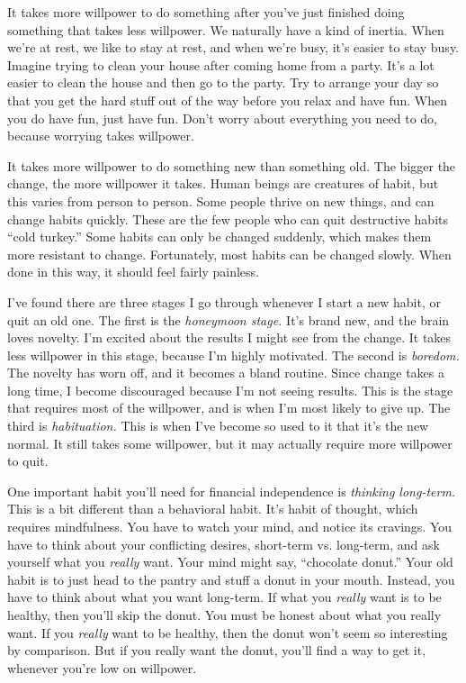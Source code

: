 It takes more willpower to do something after you've just finished doing something that takes less willpower. We naturally have a kind of inertia. When we're at rest, we like to stay at rest, and when we're busy, it's easier to stay busy. Imagine trying to clean your house after coming home from a party. It's a lot easier to clean the house and then go to the party. Try to arrange your day so that you get the hard stuff out of the way before you relax and have fun. When you do have fun, just have fun. Don't worry about everything you need to do, because worrying takes willpower.

It takes more willpower to do something new than something old. The bigger the change, the more willpower it takes. Human beings are creatures of habit, but this varies from person to person. Some people thrive on new things, and can change habits quickly. These are the few people who can quit destructive habits ``cold turkey.'' Some habits can only be changed suddenly, which makes them more resistant to change. Fortunately, most habits can be changed slowly. When done in this way, it should feel fairly painless.

I've found there are three stages I go through whenever I start a new habit, or quit an old one. The first is the \emph{honeymoon stage.} It's brand new, and the brain loves novelty. I'm excited about the results I might see from the change. It takes less willpower in this stage, because I'm highly motivated. The second is \emph{boredom.} The novelty has worn off, and it becomes a bland routine. Since change takes a long time, I become discouraged because I'm not seeing results. This is the stage that requires most of the willpower, and is when I'm most likely to give up. The third is \emph{habituation.} This is when I've become so used to it that it's the new normal. It still takes some willpower, but it may actually require more willpower to quit.

One important habit you'll need for financial independence is \emph{thinking long-term.} This is a bit different than a behavioral habit. It's habit of thought, which requires mindfulness. You have to watch your mind, and notice its cravings. You have to think about your conflicting desires, short-term vs. long-term, and ask yourself what you \emph{really} want. Your mind might say, ``chocolate donut.'' Your old habit is to just head to the pantry and stuff a donut in your mouth. Instead, you have to think about what you want long-term. If what you \emph{really} want is to be healthy, then you'll skip the donut. You must be honest about what you really want. If you \emph{really} want to be healthy, then the donut won't seem so interesting by comparison. But if you really want the donut, you'll find a way to get it, whenever you're low on willpower.

